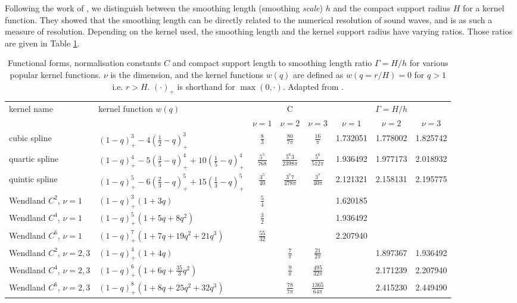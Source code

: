 Following the work of \cite{dehnenImprovingConvergenceSmoothed2012}, we distinguish between the smoothing length (smoothing \emph{scale}) $h$ and the compact support radius $H$ for a kernel function.
They showed that the smoothing length can be directly related to the numerical resolution of sound waves, and is as such a measure of resolution.
Depending on the kernel used, the smoothing length and the kernel support radius have varying ratios.
Those ratios are given in Table \ref{tab:kernels}.







\begin{table}
\caption{
	\label{tab:kernels}
	Functional forms, normalisation constants $C$ and compact support length to smoothing length ratio $\Gamma = H/h$ for various popular kernel functions.
	$\nu$ is the dimension, and the kernel functions $w(q)$ are defined as $w(q = r/H) = 0 $ for $q > 1$ i.e. $r > H$.
	$(\cdot)_+$ is shorthand for $\max(0, \cdot)$.
	Adapted from \cite{dehnenImprovingConvergenceSmoothed2012}.
}
\centering
\scriptsize
\setlength\tabcolsep{5pt}
\renewcommand{\arraystretch}{1.6}
\begin{tabular}{llcccccc}
kernel name & kernel function $w(q)$ & \multicolumn{3}{c}{C} & \multicolumn{3}{c}{$\Gamma = H/h$} \\ 
 	&  & $\nu = 1$ & $\nu = 2$ & $\nu = 3$ & $\nu = 1$ & $\nu = 2$ & $\nu = 3$ \\ 
\hline 
cubic spline & $(1 - q)_+^3 - 4(\frac{1}{2} - q)_+^3 $ & $\frac{8}{3}$ & $\frac{80}{7 \pi}$ & $\frac{16}{\pi}$ &  1.732051 &  1.778002  &  1.825742
 \\ 
quartic spline & $(1 - q)_+^4 - 5(\frac{3}{5} - q)_+^4 + 10 (\frac{1}{5} - q)_+^4 $ & $\frac{5^5}{768}$ & $\frac{5^6 3}{2398 \pi}$ & $\frac{5^6}{512 \pi}$ & 1.936492  & 1.977173  &  2.018932
 \\ 
quintic spline & $(1 - q)_+^5 - 6(\frac{2}{3} - q)_+^5 + 15(\frac{1}{3} - q)_+^5 $ & $\frac{3^5}{40}$ & $\frac{3^7 7}{478 \pi}$ & $\frac{3^7}{40 \pi}$ &  2.121321  &  2.158131  &  2.195775
 \\ 
\hline 
Wendland $C^2$, $\nu = 1$ & $(1 - q)_+^3 (1 + 3q) $ & $\frac{5}{4}$ &  &  &  1.620185
  &  &  \\ 
Wendland $C^4$, $\nu = 1$ & $(1 - q)_+^5 (1 + 5q + 8q^2) $ & $\frac{3}{2}$ &  &  &  1.936492
 &  &  \\ 
Wendland $C^6$, $\nu = 1$ & $(1 - q)_+^7 (1 + 7q + 19q^2 + 21 q^3) $ & $\frac{55}{32}$ &  &  &  2.207940
  &  &  \\ 
\hline 
Wendland $C^2$, $\nu = 2,3$ & $(1 - q)_+^4 (1 + 4q) $ &  & $\frac{7}{\pi}$ & $\frac{21}{2\pi}$ &  &  1.897367  &  1.936492
 \\ 
Wendland $C^4$, $\nu = 2,3$ & $(1 - q)_+^6 (1 + 6q + \frac{35}{3} q^2 ) $ &  & $\frac{9}{\pi}$ & $\frac{495}{32 \pi}$ &  &  2.171239  &  2.207940
 \\ 
Wendland $C^6$, $\nu = 2,3$ & $(1 - q)_+^8 (1 + 8q + 25q^2 + 32q^3 ) $ &  & $\frac{78}{7\pi}$ & $\frac{1365}{64 \pi}$ &  &  2.415230  &  2.449490
 \\ 
\end{tabular}
\end{table}

